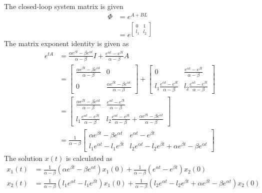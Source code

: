 The closed-loop system matrix is given 
\begin{equation}
\begin{split}
    \Phi&=e^{A+BL}\\
    &=e^{\begin{bmatrix}
    0& 1\\l_1& l_2
    \end{bmatrix}}
\end{split}
\end{equation}
The matrix exponent identity is given as
\begin{equation}
\begin{split}
    e^{tA}&=\frac{\alpha e^{\beta t}-\beta e^{\alpha t}}{\alpha-\beta}I+\frac{e^{\alpha t}- e^{\beta t}}{\alpha-\beta}A\\
    &=\begin{bmatrix}
        \frac{\alpha e^{\beta t}-\beta e^{\alpha t}}{\alpha-\beta}& 0\\
        0& \frac{\alpha e^{\beta t}-\beta e^{\alpha t}}{\alpha-\beta}
    \end{bmatrix}+\begin{bmatrix}
        0& \frac{e^{\alpha t}- e^{\beta t}}{\alpha-\beta}\\
        l_1\frac{e^{\alpha t}- e^{\beta t}}{\alpha-\beta}& l_2\frac{e^{\alpha t}- e^{\beta t}}{\alpha-\beta}
    \end{bmatrix}\\
    &=\begin{bmatrix}
        \frac{\alpha e^{\beta t}-\beta e^{\alpha t}}{\alpha-\beta}& \frac{e^{\alpha t}- e^{\beta t}}{\alpha-\beta}\\
        l_1\frac{e^{\alpha t}- e^{\beta t}}{\alpha-\beta}& l_2\frac{e^{\alpha t}- e^{\beta t}}{\alpha-\beta}+\frac{\alpha e^{\beta t}-\beta e^{\alpha t}}{\alpha-\beta}
    \end{bmatrix}\\
    &=\frac{1}{\alpha-\beta}\begin{bmatrix}
        \alpha e^{\beta t}-\beta e^{\alpha t}& e^{\alpha t}- e^{\beta t}\\
        l_1e^{\alpha t}-l_1e^{\beta t}& l_2e^{\alpha t}-l_2e^{\beta t}+\alpha e^{\beta t}-\beta e^{\alpha t}
    \end{bmatrix}
\end{split}
\end{equation}
The solution $x(t)$ is calculated as
\begin{equation}
\begin{split}
x_1(t)&=\frac{1}{\alpha-\beta}
(\alpha e^{\beta t}-\beta e^{\alpha t})x_1(0)
+\frac{1}{\alpha-\beta}(e^{\alpha t}- e^{\beta t})x_2(0)\\
x_2(t)&=\frac{1}{\alpha-\beta}
(l_1e^{\alpha t}-l_1e^{\beta t})x_1(0)
+\frac{1}{\alpha-\beta}(l_2e^{\alpha t}-l_2e^{\beta t}+\alpha e^{\beta t}-\beta e^{\alpha t})x_2(0)
\end{split}
\end{equation}
